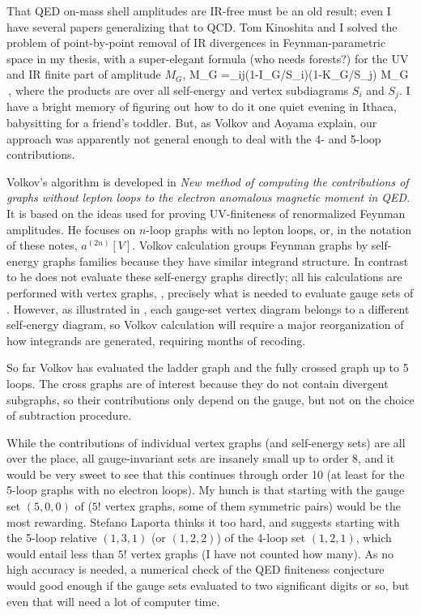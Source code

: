 That QED on-mass shell amplitudes are IR-free must be an old result; even
I have several papers generalizing that to
QCD. Tom Kinoshita and I solved
the problem of point-by-point removal of IR divergences in
Feynman-parametric space in my thesis, with a
super-elegant formula (who needs forests?) for the UV and IR finite part
of amplitude $M_G$,
\beq
\Delta M_G =\prod_{ij}(1-I_{G/S_i})(1-K_{G/S_j}) M_G
\,,
where the products are over all self-energy and vertex subdiagrams $S_i$
and $S_j$.
I have a bright memory of figuring out how to do it one quiet evening in
Ithaca, babysitting for a friend's toddler. But, as Volkov
and Aoyama \etal{} explain, our approach was apparently
not general enough to deal with the 4- and 5-loop contributions.

Volkov's algorithm is developed in {\em New method of computing the
contributions of graphs without lepton loops to the electron anomalous
magnetic moment in {QED}}. It is based on the ideas used for
proving UV-finiteness of renormalized Feynman
amplitudes. He focuses on $n$-loop graphs with no
lepton loops, or, in the notation of these notes, $a^{(2n)}[V]$.
%
Volkov calculation groups Feynman graphs by self-energy graphs families
because they have similar integrand structure. In contrast to
 he does not evaluate
these self-energy graphs directly; all his calculations are performed
with vertex graphs, \ie, precisely what is needed to evaluate gauge sets
of . However, as illustrated in
, each gauge-set vertex diagram belongs to a
different self-energy diagram, so Volkov calculation will require a major
reorganization of how integrands are generated, requiring months
of recoding.

So far Volkov  has evaluated the ladder graph
and the fully crossed graph
up to 5 loops. The cross graphs are of interest because they do not
contain divergent subgraphs, so their contributions only depend on the
gauge, but not on the choice of subtraction procedure.

While the contributions of individual vertex graphs (and self-energy
sets) are all over the place, all gauge-invariant sets are
insanely small up to order 8, and it would be very sweet to see that this
continues through order 10 (at least for the 5-loop graphs with no
electron loops).
My hunch is that starting with the gauge set $(5,0,0)$ of
 ($5!$ vertex graphs, some of them symmetric pairs)
would be the most rewarding.
Stefano Laporta thinks it too hard, and suggests starting with the 5-loop
relative
$(1,3,1)$ (or $(1,2,2)$) of the 4-loop set $(1,2,1)$,
which would entail less than $5!$ vertex graphs (I have not counted
how many). As no high accuracy is needed, a numerical check of the QED
finiteness conjecture would good enough if the gauge sets evaluated
to two significant digits or so, but even that will need a lot of
computer time.

